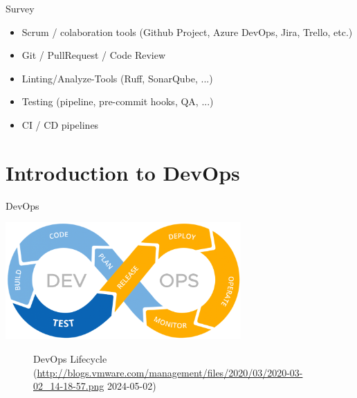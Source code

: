 \documentclass[10pt]{beamer}
\begin{document}
\begin{frame}{Survey}
	\begin{itemize}
		\item Scrum / colaboration tools (Github Project, Azure DevOps, Jira, Trello, etc.)
		\item Git / PullRequest / Code Review
		\item Linting/Analyze-Tools (Ruff, SonarQube, ...)
		\item Testing (pipeline, pre-commit hooks, QA, ...)
		\item CI / CD pipelines
	\end{itemize}
\end{frame}


\section{Introduction to DevOps}
\begin{frame}{DevOps}
    \begin{center}
        \includegraphics[width=9cm]{devops_lifecycle.png}
        \begin{figure}
            \caption{DevOps Lifecycle (\url{http://blogs.vmware.com/management/files/2020/03/2020-03-02_14-18-57.png} 2024-05-02)}
        \end{figure}
    \end{center}
\end{frame}

\end{document}
